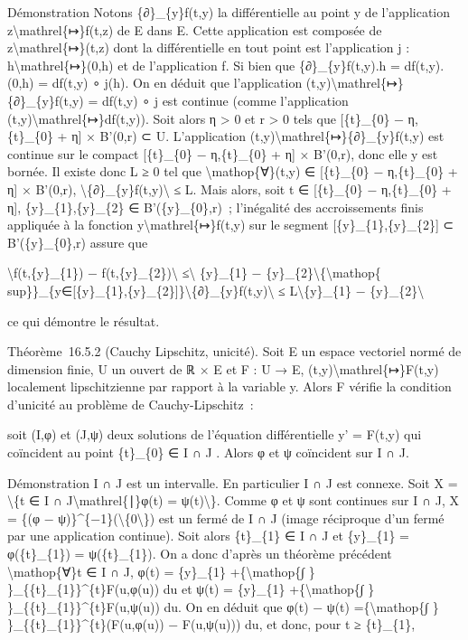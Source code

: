 \documentclass[]{article}
\begin{document}
Démonstration Notons \{∂\}\_\{y\}f(t,y) la différentielle au point y de
l'application z\textbackslash{}mathrel\{↦\}f(t,z) de E dans E. Cette
application est composée de z\textbackslash{}mathrel\{↦\}(t,z) dont la
différentielle en tout point est l'application j :
h\textbackslash{}mathrel\{↦\}(0,h) et de l'application f. Si bien que
\{∂\}\_\{y\}f(t,y).h = df(t,y).(0,h) = df(t,y) ∘ j(h). On en déduit que
l'application (t,y)\textbackslash{}mathrel\{↦\}\{∂\}\_\{y\}f(t,y) =
df(t,y) ∘ j est continue (comme l'application
(t,y)\textbackslash{}mathrel\{↦\}df(t,y)). Soit alors η \textgreater{} 0
et r \textgreater{} 0 tels que {[}\{t\}\_\{0\} − η,\{t\}\_\{0\} + η{]} ×
B'(0,r) ⊂ U. L'application
(t,y)\textbackslash{}mathrel\{↦\}\{∂\}\_\{y\}f(t,y) est continue sur le
compact {[}\{t\}\_\{0\} − η,\{t\}\_\{0\} + η{]} × B'(0,r), donc elle y
est bornée. Il existe donc L ≥ 0 tel que
\textbackslash{}mathop\{∀\}(t,y) ∈ {[}\{t\}\_\{0\} − η,\{t\}\_\{0\} +
η{]} × B'(0,r),
\textbackslash{}\textbar{}\{∂\}\_\{y\}f(t,y)\textbackslash{}\textbar{} ≤
L. Mais alors, soit t ∈ {[}\{t\}\_\{0\} − η,\{t\}\_\{0\} + η{]},
\{y\}\_\{1\},\{y\}\_\{2\} ∈ B'(\{y\}\_\{0\},r)~; l'inégalité des
accroissements finis appliquée à la fonction
y\textbackslash{}mathrel\{↦\}f(t,y) sur le segment
{[}\{y\}\_\{1\},\{y\}\_\{2\}{]} ⊂ B'(\{y\}\_\{0\},r) assure que

\textbackslash{}\textbar{}f(t,\{y\}\_\{1\}) −
f(t,\{y\}\_\{2\})\textbackslash{}\textbar{} ≤\textbackslash{}\textbar{}
\{y\}\_\{1\} −
\{y\}\_\{2\}\textbackslash{}\textbar{}\{\textbackslash{}mathop\{
sup\}\}\_\{y∈{[}\{y\}\_\{1\},\{y\}\_\{2\}{]}\}\textbackslash{}\textbar{}\{∂\}\_\{y\}f(t,y)\textbackslash{}\textbar{}
≤ L\textbackslash{}\textbar{}\{y\}\_\{1\} −
\{y\}\_\{2\}\textbackslash{}\textbar{}

ce qui démontre le résultat.

Théorème~16.5.2 (Cauchy Lipschitz, unicité). Soit E un espace vectoriel
normé de dimension finie, U un ouvert de ℝ × E et F : U → E,
(t,y)\textbackslash{}mathrel\{↦\}F(t,y) localement lipschitzienne par
rapport à la variable y. Alors F vérifie la condition d'unicité au
problème de Cauchy-Lipschitz~:

soit (I,φ) et (J,ψ) deux solutions de l'équation différentielle y' =
F(t,y) qui coïncident au point \{t\}\_\{0\} ∈ I ∩ J . Alors φ et ψ
coïncident sur I ∩ J.

Démonstration I ∩ J est un intervalle. En particulier I ∩ J est connexe.
Soit X = \textbackslash{}\{t ∈ I ∩ J\textbackslash{}mathrel\{∣\}φ(t) =
ψ(t)\textbackslash{}\}. Comme φ et ψ sont continues sur I ∩ J, X = \{(φ
− ψ)\}\^{}\{−1\}(\textbackslash{}\{0\textbackslash{}\}) est un fermé de
I ∩ J (image réciproque d'un fermé par une application continue). Soit
alors \{t\}\_\{1\} ∈ I ∩ J et \{y\}\_\{1\} = φ(\{t\}\_\{1\}) =
ψ(\{t\}\_\{1\}). On a donc d'après un théorème précédent
\textbackslash{}mathop\{∀\}t ∈ I ∩ J, φ(t) = \{y\}\_\{1\}
+\{\textbackslash{}mathop\{∫ \} \}\_\{\{t\}\_\{1\}\}\^{}\{t\}F(u,φ(u))
du et ψ(t) = \{y\}\_\{1\} +\{\textbackslash{}mathop\{∫ \}
\}\_\{\{t\}\_\{1\}\}\^{}\{t\}F(u,ψ(u)) du. On en déduit que φ(t) − ψ(t)
=\{\textbackslash{}mathop\{∫ \} \}\_\{\{t\}\_\{1\}\}\^{}\{t\}(F(u,φ(u))
− F(u,ψ(u))) du, et donc, pour t ≥ \{t\}\_\{1\},
\end{document}
